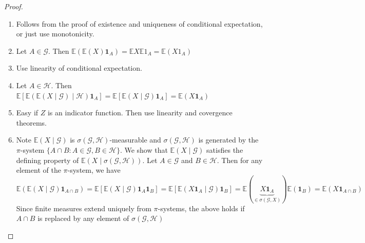 \documentclass[parskip=full]{article}
\theoremstyle{definition}
\newcommand{\1}{\mathbbm{1}}
\newcommand{\E}{\mathbb{E}}
\begin{document}
\begin{proof}
  \begin{enumerate}
    \item Follows from the proof of existence and uniqueness of conditional expectation, or just use monotonicity.
    \item Let $A \in \mathcal{G}$. Then $\E( \E(X) \mathbf{1}_A) = \E X \E 1_A = \E (X 1_A)$
    \item Use linearity of conditional expectation.
    \item Let $A \in \mathcal{H}$. Then $\E\left[\E(\E(X \mid \mathcal{G}) \mid \mathcal{H}) \mathbf{1}_A \right] = \E [\E(X \mid \mathcal{G}) \mathbf{1}_A] = \E(X \mathbf{1}_A)$
    \item Easy if $Z$ is an indicator function. Then use linearity and covergence theorems.
    \item Note $\E (X \mid \mathcal{G})$ is $\sigma(\mathcal{G}, \mathcal{H})$-measurable and $\sigma(\mathcal{G}, \mathcal{H})$ is generated by the $\pi$-system $\{A \cap B: A \in \mathcal{G}, B \in \mathcal{H}\}$. We show that $\E(X \mid \mathcal{G})$ satisfies the defining property of $\E(X \mid \sigma(\mathcal{G}, \mathcal{H}))$. Let $A \in \mathcal{G}$ and $B \in \mathcal{H}$. Then for any element of the $\pi$-system, we have
          \[
            \E(\E(X \mid \mathcal{G}) \mathbf{1}_{A \cap B}) = \E [\E(X \mid \mathcal{G}) \mathbf{1}_A \mathbf{1}_B] = \E [\E(X \mathbf{1}_A \mid \mathcal{G}) \mathbf{1}_B] = \E(\underbrace{X \mathbf{1}_A}_{\in \sigma(\mathcal{G}, X)}) \E(\mathbf{1}_B) = \E(X \mathbf{1}_{A \cap B})
          \]
          Since finite measures extend uniquely from $\pi$-systems, the above holds if $A\cap B$ is replaced by any element of $\sigma(\mathcal{G}, \mathcal{H})$
  \end{enumerate}
\end{proof}
\end{document}
